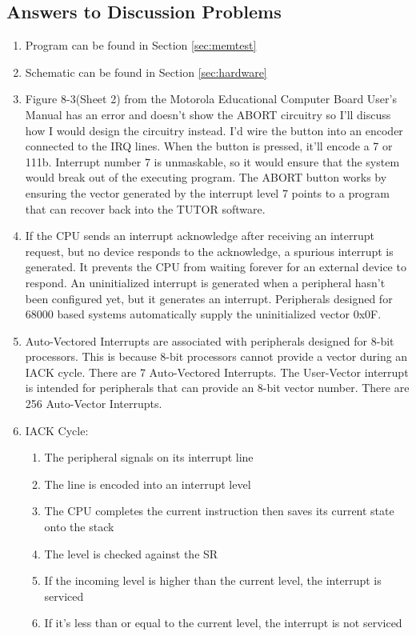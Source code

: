 \documentclass[12pt,Letter]{article}
\begin{document}
\subsection{Answers to Discussion Problems}
\begin{enumerate}
	\item Program can be found in Section \ref{sec:memtest}
	\item Schematic can be found in Section \ref{sec:hardware}
	\item Figure 8-3(Sheet 2) from the Motorola Educational Computer Board User's Manual has an error and doesn't show the ABORT circuitry so I'll discuss how I would design the circuitry instead. I'd wire the button into an encoder connected to the IRQ lines. When the button is pressed, it'll encode a 7 or 111b. Interrupt number 7 is unmaskable, so it would ensure that the system would break out of the executing program. The ABORT button works by ensuring the vector generated by the interrupt level 7 points to a program that can recover back into the TUTOR software.
	\item If the CPU sends an interrupt acknowledge after receiving an interrupt request, but no device responds to the acknowledge, a spurious interrupt is generated. It prevents the CPU from waiting forever for an external device to respond. An uninitialized interrupt is generated when a peripheral hasn't been configured yet, but it generates an interrupt. Peripherals designed for 68000 based systems automatically supply the uninitialized vector 0x0F.
	\item Auto-Vectored Interrupts are associated with peripherals designed for 8-bit processors. This is because 8-bit processors cannot provide a vector during an IACK cycle. There are 7 Auto-Vectored Interrupts. The User-Vector interrupt is intended for peripherals that can provide an 8-bit vector number. There are 256 Auto-Vector Interrupts.
	\item IACK Cycle:
		\begin{enumerate}
			\item The peripheral signals on its interrupt line
			\item The line is encoded into an interrupt level
			\item The CPU completes the current instruction then saves
			its current state onto the stack
			\item The level is checked against the SR
			\item If the incoming level is higher than the current level, the interrupt is serviced
			\item If it's less than or equal to the current level, the interrupt is not serviced
		\end{enumerate}
\end{enumerate}
\end{document}
